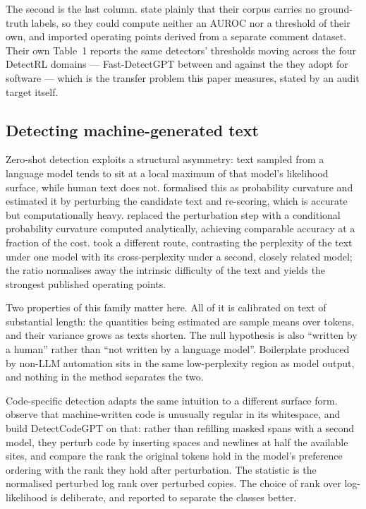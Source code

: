 The second is the last column. \citet{ji2026exploratory} state plainly that their corpus
carries no ground-truth labels, so they could compute neither an AUROC nor a threshold
of their own, and imported operating points derived from a separate comment dataset.
Their own Table~1 reports the same detectors' thresholds moving across the four DetectRL
domains --- Fast-DetectGPT between  and  against the
 they adopt for software --- which is the transfer problem this paper
measures, stated by an audit target itself.

\subsection{Detecting machine-generated text}
\label{sec:background:detection}

Zero-shot detection exploits a structural asymmetry: text sampled from a language model
tends to sit at a local maximum of that model's likelihood surface, while human text
does not. \citet{mitchell2023detectgpt} formalised this as probability curvature and
estimated it by perturbing the candidate text and re-scoring, which is accurate but
computationally heavy. \citet{bao2024fastdetectgpt} replaced the perturbation step with
a conditional probability curvature computed analytically, achieving comparable accuracy
at a fraction of the cost. \citet{hans2024binoculars} took a different route, contrasting
the perplexity of the text under one model with its cross-perplexity under a second,
closely related model; the ratio normalises away the intrinsic difficulty of the text
and yields the strongest published operating points.

Two properties of this family matter here. All of it is calibrated on text of
substantial length: the quantities being estimated are sample means over tokens, and
their variance grows as texts shorten. The null hypothesis is also ``written by a
human'' rather than ``not written by a language model''. Boilerplate produced by
non-LLM automation sits in the same low-perplexity region as model output, and nothing
in the method separates the two.

Code-specific detection adapts the same intuition to a different surface form.
\citet{shi2025betweenlines} observe that machine-written code is unusually regular in
its whitespace, and build DetectCodeGPT on that: rather than refilling masked spans with
a second model, they perturb code by inserting spaces and newlines at half the available
sites, and compare the rank the original tokens hold in the model's preference ordering
with the rank they hold after perturbation. The statistic is the normalised perturbed
log rank over  perturbed copies. The choice of rank over log-likelihood is
deliberate, and reported to separate the classes better.

